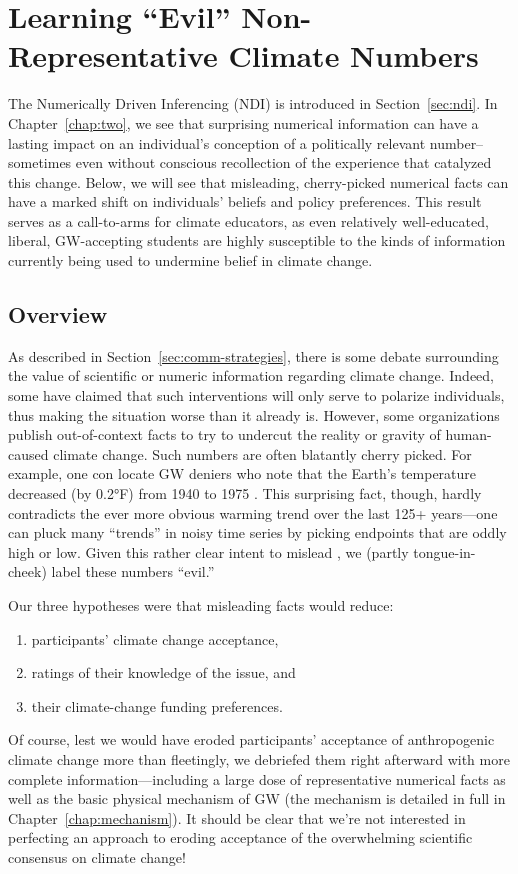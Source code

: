 \graphicspath{{evil-ndi/}}

\chapter{Learning \texorpdfstring{``Evil''}{"Evil"} Non-Representative Climate Numbers}
\label{chap:evilndi}

The Numerically Driven Inferencing (NDI) is introduced in
Section~\ref{sec:ndi}. In Chapter~\ref{chap:two}, we
see that surprising numerical information can have a lasting impact on an
individual's conception of a politically relevant number--sometimes even without
conscious recollection of the experience that catalyzed this change.  Below, we
will see that misleading, cherry-picked numerical facts can have a marked shift
on individuals' beliefs and policy preferences. This result serves as a
call-to-arms for climate educators, as even relatively well-educated, liberal,
GW-accepting students are highly susceptible to the kinds of information
currently being used to undermine belief in climate change.

\section{Overview}

As described in Section~\ref{sec:comm-strategies},
there is some debate surrounding the value of scientific or numeric information
regarding climate change. Indeed, some have claimed that such interventions will
only serve to polarize individuals, thus making the situation worse than it
already is. However, some organizations publish out-of-context facts to try to
undercut the reality or gravity of human-caused climate change. Such numbers are
often blatantly cherry picked. For example, one con locate GW deniers who note
that the Earth’s temperature decreased (by 0.2°F) from 1940 to 1975
\parencite{jastrow_global_1991}. This surprising fact, though, hardly
contradicts the ever more obvious warming trend over the last 125+ years---one
can pluck many ``trends'' in noisy time series by picking endpoints that are
oddly high or low. Given this rather clear intent to mislead
\parencite[corroborated by][]{oreskes_merchants_2010}, we (partly
tongue-in-cheek) label these numbers ``evil.'' 

Our three hypotheses were that misleading facts would reduce:
\begin{enumerate}
    \item participants’ climate change acceptance, 
    \item ratings of their knowledge of the issue, and 
    \item their climate-change funding preferences.
\end{enumerate}
Of course, lest we would have eroded participants’ acceptance of anthropogenic
climate change more than fleetingly, we debriefed them right afterward with more
complete information---including a large dose of representative numerical facts
as well as the basic physical mechanism of GW (the mechanism is detailed in full
in Chapter~\ref{chap:mechanism}). It should be clear that we're not interested
in perfecting an approach to eroding acceptance of the overwhelming scientific
consensus on climate change! 

